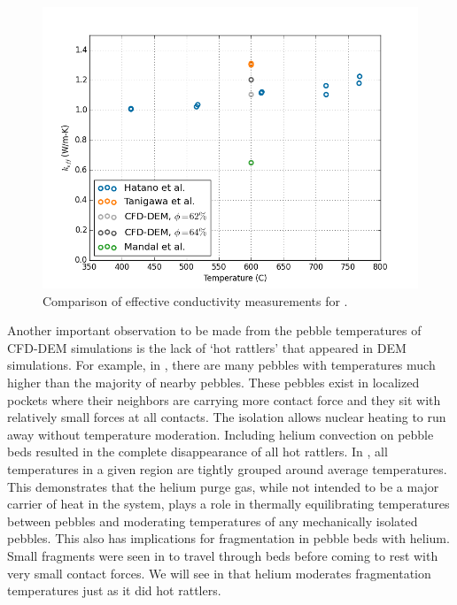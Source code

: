 \begin{figure}[ht]
\centering
    \includegraphics[width=\singleimagewidth]{figures/initial_packing_study/keff-he-comparisons.png}
    \caption{Comparison of effective conductivity measurements for \lit.}
    \label{fig:keff-cfd-comparisons}
\end{figure}


Another important observation to be made from the pebble temperatures of CFD-DEM simulations is the lack of `hot rattlers' that appeared in DEM simulations. For example, in , there are many pebbles with temperatures much higher than the majority of nearby pebbles. These pebbles exist in localized pockets where their neighbors are carrying more contact force and they sit with relatively small forces at all contacts. The isolation allows nuclear heating to run away without temperature moderation. Including helium convection on pebble beds resulted in the complete disappearance of all hot rattlers. In , all temperatures in a given region are tightly grouped around average temperatures. This demonstrates that the helium purge gas, while not intended to be a major carrier of heat in the system, plays a role in thermally equilibrating temperatures between pebbles and moderating temperatures of any mechanically isolated pebbles. This also has implications for fragmentation in pebble beds with helium. Small fragments were seen in  to travel through beds before coming to rest with very small contact forces. We will see in  that helium moderates fragmentation temperatures just as it did hot rattlers.











